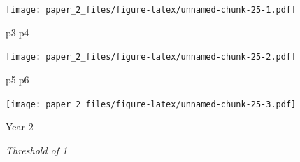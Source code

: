 \documentclass[
]{article}
\newenvironment{Shaded}{\begin{snugshade}}{\end{snugshade}}
\newcommand{\NormalTok}[1]{#1}
\newcommand{\SpecialCharTok}[1]{\textcolor[rgb]{0.00,0.00,0.00}{#1}}
\begin{document}
\texttt{[image: paper\_2\_files/figure-latex/unnamed-chunk-25-1.pdf]}

\begin{Shaded}
\begin{Highlighting}[]
\NormalTok{p3}\SpecialCharTok{|}\NormalTok{p4}
\end{Highlighting}
\end{Shaded}

\texttt{[image: paper\_2\_files/figure-latex/unnamed-chunk-25-2.pdf]}

\begin{Shaded}
\begin{Highlighting}[]
\NormalTok{p5}\SpecialCharTok{|}\NormalTok{p6}
\end{Highlighting}
\end{Shaded}

\texttt{[image: paper\_2\_files/figure-latex/unnamed-chunk-25-3.pdf]}

Year 2

\emph{Threshold of 1}
\end{document}

